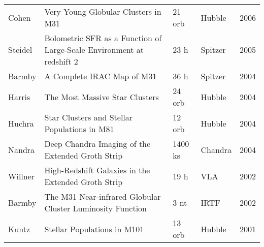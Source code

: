 \begin{tabularx}{\textwidth}{Xp{10cm}XXX}
Cohen & Very Young Globular Clusters in M31 & 21 orb & Hubble & 2006\\
Steidel  & Bolometric SFR as a Function of Large-Scale Environment at redshift 2 & 23 h &Spitzer  & 2005\\ %
Barmby & A Complete IRAC Map of M31 & 36 h & Spitzer    & 2004\\ %
Harris & The Most Massive Star Clusters & 24 orb & Hubble & 2004\\
Huchra & Star Clusters and Stellar Populations in M81 & 12 orb & Hubble & 2004\\
Nandra & Deep Chandra Imaging of the Extended Groth Strip  & 1400 ks & Chandra & 2004 \\
Willner & High-Redshift Galaxies in the Extended Groth Strip & 19 h & VLA & 2002\\
Barmby & The M31 Near-infrared Globular Cluster Luminosity Function  & 3 nt & IRTF & 2002\\
Kuntz & Stellar Populations in M101 & 13 orb & Hubble & 2001\\
\end{tabularx}


